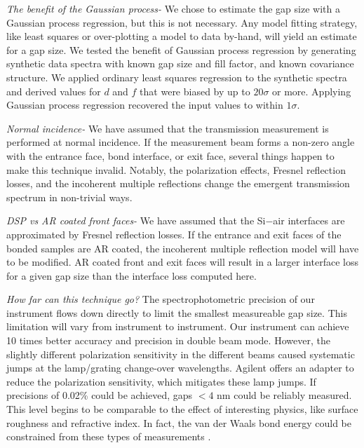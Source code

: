 \documentclass[osajnl,preprint,showpacs,superscriptaddress,12pt]{revtex4-1} %
\begin{document}
\emph{The benefit of the Gaussian process-} We chose to estimate the gap size with a Gaussian process regression, but this is not necessary.  Any model fitting strategy, like least squares or over-plotting a model to data by-hand, will yield an estimate for a gap size.  We tested the benefit of Gaussian process regression by generating synthetic data spectra with known gap size and fill factor, and known covariance structure.  We applied ordinary least squares regression to the synthetic spectra and derived values for $d$ and $f$ that were biased by up to $20\sigma$ or more.  Applying Gaussian process regression recovered the input values to within $1\sigma$.

\emph{Normal incidence- } We have assumed that the transmission measurement is performed at normal incidence.  If the measurement beam forms a non-zero angle with the entrance face, bond interface, or exit face, several things happen to make this technique invalid.  Notably, the polarization effects, Fresnel reflection losses, and the incoherent multiple reflections change the emergent transmission spectrum in non-trivial ways.

\emph{DSP vs AR coated front faces- } We have assumed that the Si$-$air interfaces are approximated by Fresnel reflection losses.  If the entrance and exit faces of the bonded samples are AR coated, the incoherent multiple reflection model will have to be modified.  AR coated front and exit faces will result in a larger interface loss for a given gap size than the interface loss computed here.

\emph{How far can this technique go?}  The spectrophotometric precision of our instrument flows down directly to limit the smallest measureable gap size.  This limitation will vary from instrument to instrument.  Our instrument can achieve 10 times better accuracy and precision in double beam mode.  However, the slightly different polarization sensitivity in the different beams caused systematic jumps at the lamp/grating change-over wavelengths.  Agilent offers an adapter to reduce the polarization sensitivity, which mitigates these lamp jumps.  If precisions of 0.02\% could be achieved, gaps $<4$ nm could be reliably measured.  This level begins to be comparable to the effect of interesting physics, like surface roughness and refractive index.  In fact, the van der Waals bond energy could be constrained from these types of measurements \cite{2001JOptA...3...85G}.
\end{document}
